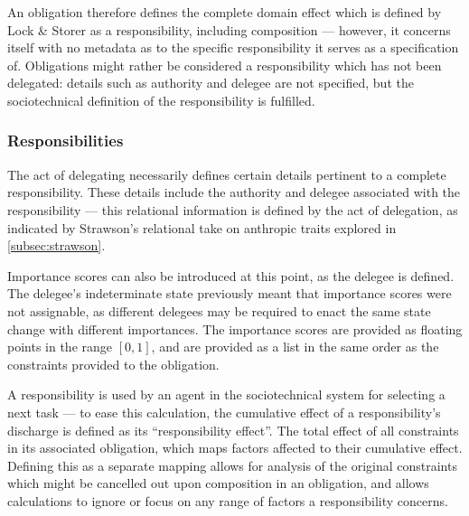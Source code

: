An obligation therefore defines the complete domain effect which is defined by Lock \& Storer as a responsibility, including composition --- however, it concerns itself with no metadata as to the specific responsibility it serves as a specification of. Obligations might rather be considered a responsibility which has not been delegated: details such as authority and delegee are not specified, but the sociotechnical definition of the responsibility is fulfilled.\par

\subsubsection{Responsibilities}\label{subsec:responsibilities}  %
The act of delegating necessarily defines certain details pertinent to a complete responsibility. These details include the authority and delegee associated with the responsibility --- this relational information is defined by the act of delegation, as indicated by Strawson's relational take on anthropic traits explored in \cref{subsec:strawson}.\par

Importance scores can also be introduced at this point, as the delegee is defined. The delegee's indeterminate state previously meant that importance scores were not assignable, as different delegees may be required to enact the same state change with different importances. The importance scores are provided as floating points in the range \([0,1]\), and are provided as a list in the same order as the constraints provided to the obligation.\par

A responsibility is used by an agent in the sociotechnical system for selecting a next task --- to ease this calculation, the cumulative effect of a responsibility's discharge is defined as its ``responsibility effect''. The total effect of all constraints in its associated obligation, which maps factors affected to their cumulative effect. Defining this as a separate mapping allows for analysis of the original constraints which might be cancelled out upon composition in an obligation, and allows calculations to ignore or focus on any range of factors a responsibility concerns.\par

